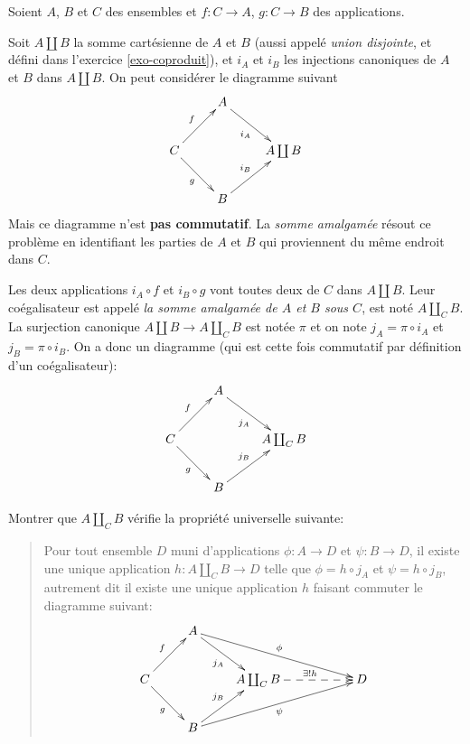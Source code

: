 \begin{exercice}
Soient $A$,  $B$ et $C$  des ensembles et $f :  C\to A$, $g : C\to B$ des applications.

Soit $A\coprod B$ la somme cartésienne de $A$ et $B$ (aussi appelé \emph{union disjointe}, et défini dans l'exercice \ref{exo-coproduit}), et $i_A$ et $i_B$ les injections canoniques de $A$ et $B$ dans $A\coprod B$. On peut considérer le diagramme suivant
\[ 
\xymatrix{
&A \ar[dr]_{i_A} &   \\
C\ar[ur]^f\ar[dr]_g& &  A\coprod B    \\
& B \ar[ur]^{i_B} & 
}\]
Mais ce diagramme n'est \textbf{pas commutatif}. La \emph{somme amalgamée} résout ce problème en \og identifiant les parties de $A$ et $B$ qui proviennent du même endroit dans $C$\fg{}.


Les deux applications $i_A \circ f$ et $i_B \circ g$ vont toutes deux de $C$ dans $A\coprod B$.  Leur coégalisateur est appelé \emph{la somme amalgamée de $A$ et $B$  sous $C$}, est noté $A\coprod_C B$. La surjection canonique  $A\coprod B \to A\coprod_C B$ est notée $\pi$ et on note $j_A = \pi \circ i_A$ et $j_B = \pi \circ i_B$. On a donc un diagramme (qui est cette fois commutatif par définition d'un coégalisateur):
\[ 
\xymatrix{
&A \ar[dr]_{j_A} &   \\
C\ar[ur]^f\ar[dr]_g& &  A\coprod_C B    \\
& B \ar[ur]^{j_B} & 
}\]

Montrer que $A\coprod_C B$ vérifie la propriété universelle suivante:
\begin{quote}
Pour tout ensemble  $D$ muni d'applications $\phi : A\to D$ et $\psi : B\to D$, il existe une unique application $h : A\coprod_C B \to D$ telle que $\phi = h\circ j_A$ et $\psi = h\circ j_B$, autrement dit il existe une unique application $h$ faisant commuter le diagramme  suivant:
\[ 
\xymatrix{
&A \ar[dr]_{j_A} \ar[drrr]^{\phi}& & & \\
C\ar[ur]^f\ar[dr]_g& &  A\coprod_C B \ar@{-->}[rr]^{\exists !h}  & & D\\
& B \ar[ur]^{j_B} \ar[urrr]_{\psi}& & &
}\]
\end{quote}
\end{exercice}

